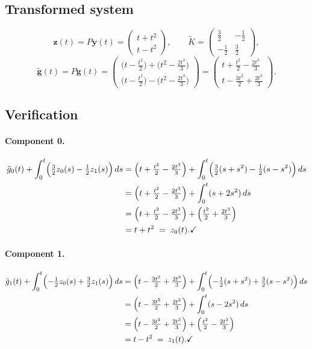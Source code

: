 \documentclass[11pt]{article}
\begin{document}
\subsection*{Transformed system}

\[
  \mathbf{z}(t) = P\mathbf{y}(t)
  = \begin{pmatrix}t+t^2\\t-t^2\end{pmatrix},
  \qquad
  \widetilde{K} = \begin{pmatrix}\tfrac{3}{2}&-\tfrac{1}{2}\\-\tfrac{1}{2}&\tfrac{3}{2}\end{pmatrix},
\]
\[
  \widetilde{\mathbf{g}}(t) = P\mathbf{g}(t)
  = \begin{pmatrix}
      \bigl(t-\tfrac{t^2}{2}\bigr)+\bigl(t^2-\tfrac{2t^3}{3}\bigr)\\[4pt]
      \bigl(t-\tfrac{t^2}{2}\bigr)-\bigl(t^2-\tfrac{2t^3}{3}\bigr)
    \end{pmatrix}
  = \begin{pmatrix}
      t+\tfrac{t^2}{2}-\tfrac{2t^3}{3}\\[4pt]
      t-\tfrac{3t^2}{2}+\tfrac{2t^3}{3}
    \end{pmatrix}.
\]

\subsection*{Verification}

\paragraph{Component 0.}
\begin{align*}
  \tilde{g}_0(t) + \int_0^t\Bigl(\tfrac{3}{2}z_0(s)-\tfrac{1}{2}z_1(s)\Bigr)\,ds
  &= \Bigl(t+\tfrac{t^2}{2}-\tfrac{2t^3}{3}\Bigr)
     + \int_0^t\Bigl(\tfrac{3}{2}(s+s^2)-\tfrac{1}{2}(s-s^2)\Bigr)\,ds \\
  &= \Bigl(t+\tfrac{t^2}{2}-\tfrac{2t^3}{3}\Bigr)
     + \int_0^t(s+2s^2)\,ds \\
  &= \Bigl(t+\tfrac{t^2}{2}-\tfrac{2t^3}{3}\Bigr)
     + \Bigl(\tfrac{t^2}{2}+\tfrac{2t^3}{3}\Bigr) \\
  &= t+t^2 \;=\; z_0(t). \checkmark
\end{align*}

\paragraph{Component 1.}
\begin{align*}
  \tilde{g}_1(t) + \int_0^t\Bigl(-\tfrac{1}{2}z_0(s)+\tfrac{3}{2}z_1(s)\Bigr)\,ds
  &= \Bigl(t-\tfrac{3t^2}{2}+\tfrac{2t^3}{3}\Bigr)
     + \int_0^t\Bigl(-\tfrac{1}{2}(s+s^2)+\tfrac{3}{2}(s-s^2)\Bigr)\,ds \\
  &= \Bigl(t-\tfrac{3t^2}{2}+\tfrac{2t^3}{3}\Bigr)
     + \int_0^t(s-2s^2)\,ds \\
  &= \Bigl(t-\tfrac{3t^2}{2}+\tfrac{2t^3}{3}\Bigr)
     + \Bigl(\tfrac{t^2}{2}-\tfrac{2t^3}{3}\Bigr) \\
  &= t-t^2 \;=\; z_1(t). \checkmark
\end{align*}
\end{document}

